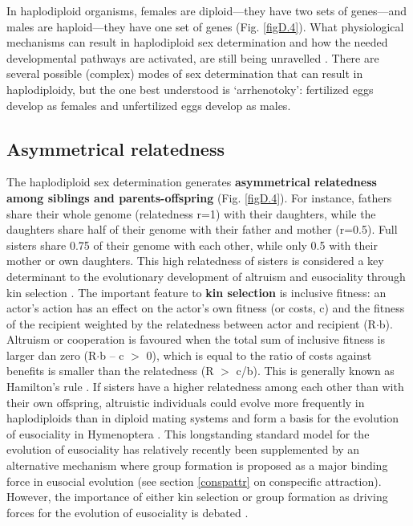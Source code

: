 \documentclass[10pt, twoside]{book} %
\begin{document}
	In haplodiploid organisms, females are diploid---they have two sets of genes---and males are haploid---they have one set of genes (Fig. \ref{figD.4}). What physiological mechanisms can result in haplodiploid sex determination and how the needed developmental pathways are activated, are still being unravelled \citep{heimpel2008}. There are several possible (complex) modes of sex determination that can result in haplodiploidy, but the one best understood is `arrhenotoky': fertilized eggs develop as females and unfertilized eggs develop as males.\\
	
	\subsection{Asymmetrical relatedness}
	The haplodiploid sex determination generates \textbf{asymmetrical relatedness among siblings and parents-offspring} (Fig. \ref{figD.4}). For instance, fathers share their whole genome (relatedness r=1) with their daughters, while the daughters share half of their genome with their father and mother (r=0.5). Full sisters share 0.75 of their genome with each other, while only 0.5 with their mother or own daughters. This high relatedness of sisters is considered a key determinant to the evolutionary development of altruism and eusociality through kin selection \citep{foster2006}. The important feature to \textbf{kin selection} is inclusive fitness: an actor's action has an effect on the actor's own fitness (or costs, c) and the fitness of the recipient weighted by the relatedness between actor and recipient (R$\cdot$b). Altruism or cooperation is favoured when the total sum of inclusive fitness is larger dan zero (R$\cdot$b -- c $>$ 0), which is equal to the ratio of costs against benefits is smaller than the relatedness (R $>$ c/b). This is generally known as Hamilton's rule \citep{hamilton1964}. If sisters have a higher relatedness among each other than with their own offspring, altruistic individuals could evolve more frequently in haplodiploids than in diploid mating systems and form a basis for the evolution of eusociality in Hymenoptera \citep{wilson1975}. This longstanding standard model for the evolution of eusociality has relatively recently been supplemented by an alternative mechanism where group formation is proposed as a major binding force in eusocial evolution \citep{wilson2005, nowak2010} (see section \ref{conspattr} on conspecific attraction). However, the importance of either kin selection or group formation as driving forces for the evolution of eusociality is debated \citep{wilson2005a, foster2006, nowak2010}.\\
	
\end{document}
